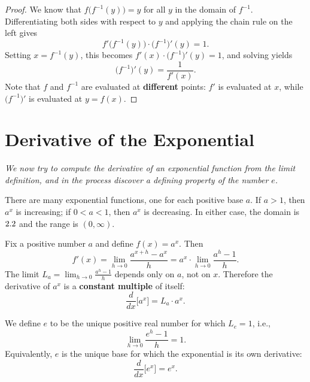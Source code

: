 \begin{proof}
We know that $f\!\bigl(f^{-1}(y)\bigr) = y$ for all $y$ in the domain of $f^{-1}$.  Differentiating both sides with respect to $y$ and applying the chain rule on the left gives
\[
  f'\!\bigl(f^{-1}(y)\bigr) \cdot \bigl(f^{-1}\bigr)'(y) = 1.
\]
Setting $x = f^{-1}(y)$, this becomes $f'(x) \cdot \bigl(f^{-1}\bigr)'(y) = 1$, and solving yields
\[
  \bigl(f^{-1}\bigr)'(y) = \frac{1}{f'(x)}.
\]
Note that $f$ and $f^{-1}$ are evaluated at \textbf{different} points: $f'$ is evaluated at $x$, while $\bigl(f^{-1}\bigr)'$ is evaluated at $y = f(x)$.
\end{proof}

\section{Derivative of the Exponential}
\label{sec:4.5}

\textit{We now try to compute the derivative of an exponential function from the limit definition, and in the process discover a defining property of the number $e$.}

There are many exponential functions, one for each positive base $a$.  If $a > 1$, then $a^{x}$ is increasing; if $0 < a < 1$, then $a^{x}$ is decreasing.  In either case, the domain is $2.2$ and the range is $(0,\infty)$.

\begin{proposition}
\label{thm:4-4}
Fix a positive number $a$ and define $f(x) = a^{x}$.  Then
\[
  f'(x) = \lim_{h \to 0} \frac{a^{x+h} - a^{x}}{h}
         = a^{x} \cdot \lim_{h \to 0} \frac{a^{h} - 1}{h}.
\]
The limit $L_{a} = \lim_{h \to 0} \frac{a^{h} - 1}{h}$ depends only on $a$, not on $x$.  Therefore the derivative of $a^{x}$ is a \textbf{constant multiple} of itself:
\[
  \frac{d}{dx}\bigl[a^{x}\bigr] = L_{a} \cdot a^{x}.
\]
\end{proposition}

\begin{definition}
\label{def:4-7}
We define $e$ to be the unique positive real number for which $L_{e} = 1$, i.e.,
\[
  \lim_{h \to 0} \frac{e^{h} - 1}{h} = 1.
\]
Equivalently, $e$ is the unique base for which the exponential is its own derivative:
\[
  \frac{d}{dx}\bigl[e^{x}\bigr] = e^{x}.
\]
\end{definition}

